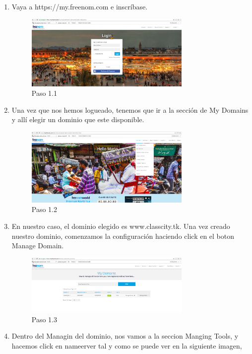 \begin{itemize}
    \begin{enumerate}
        \item Vaya a https://my.freenom.com e inscríbase.
        \begin{figure}[H]
        \centering
        \includegraphics[width=80mm]{memoria/LaTeX/img/despliegue/dominiofree/pas1_1.png}
        \caption{Paso 1.1}
        \end{figure}
         \item Una vez que nos hemos logueado, tenemos que ir a la sección de My Domains y allí elegir un dominio que este disponible.
        \begin{figure}[H]
        \centering
        \includegraphics[width=80mm]{memoria/LaTeX/img/despliegue/dominiofree/paso1_2.png}
        \caption{Paso 1.2}
        \end{figure}
        \item En nuestro caso, el dominio elegido es www.classcity.tk. Una vez creado nuestro dominio, comenzamos la configuración haciendo click en el boton Manage Domain.
        \begin{figure}[H]
        \centering
        \includegraphics[width=80mm]{memoria/LaTeX/img/despliegue/dominiofree/paso1_3.png}
        \caption{Paso 1.3}
        \end{figure}
        \item Dentro del Managin del dominio, nos vamos a la seccion Manging Tools, y hacemos click en nameerver tal y como se puede ver en la siguiente imagen,

\end{enumerate}
\end{itemize}
